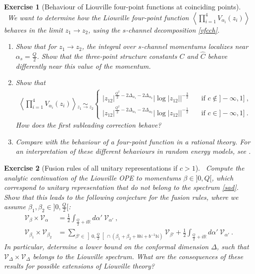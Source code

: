 \documentclass[12pt, a4paper, notitlepage, twoside]{report}
\numberwithin{equation}{section}
\theoremstyle{break}
\newtheorem{exo}{Exercise}[chapter]
\begin{document}
\begin{exo}[Behaviour of Liouville four-point functions at coinciding points]
~\label{exo4a} 
We want to determine how the Liouville four-point function $\left<\prod_{i=1}^4 V_{\alpha_i}(z_i)\right>$ behaves in the limit $z_1\to z_2$, using the $s$-channel decomposition \eqref{vfcch}.
\begin{enumerate}
 \item Show that for $z_1\to z_2$, the integral over $s$-channel momentums localizes near $\alpha_s=\frac{Q}{2}$. Show that the three-point structure constants $C$ and $\hat C$ behave differently near this value of the momentum.
 \item Show that 
 \begin{align}
  \left<\prod_{i=1}^4 V_{\alpha_i}(z_i)\right> \underset{z_1\to z_2}{\sim} \left\{
  \begin{array}{ll} 
  |z_{12}|^{\frac{Q^2}{2} -2\Delta_{\alpha_1}-2\Delta_{\alpha_2}} \left|\log|z_{12}|\right|^{-\frac32} &\quad \text{if \ } c\notin ]-\infty,1]\ ,
  \\
  |z_{12}|^{\frac{Q^2}{2} -2\Delta_{\alpha_1}-2\Delta_{\alpha_2}} \left|\log|z_{12}|\right|^{-\frac12} &\quad \text{if \ } c\in ]-\infty,1]\ .
  \end{array}\right.
 \end{align}
How does the first subleading correction behave?
\item Compare with the behaviour of a four-point function in a rational theory. 
For an interpretation of these different behaviours in random energy models, see \cite{clrs16}.
\end{enumerate}
\end{exo}


\begin{exo}[Fusion rules of all unitary representations if $c>1$]
 ~\label{exoaur}
Compute the analytic continuation of the Liouville OPE to momentums $\beta\in ]0,Q[$, which correspond to unitary representation that do not belong to the spectrum \eqref{sad}. 
Show that this leads to the following conjecture for the fusion rules, where we assume $\beta_1,\beta_2\in ]0,\frac{Q}{2}[$:
\begin{align}
 \mathcal{V}_\beta \times \mathcal{V}_\alpha  
&= \frac12 \int_{\frac{Q}{2}+i\mathbb{R}} d\alpha'\ \mathcal{V}_{\alpha'}\ ,
\\
 \mathcal{V}_{\beta_1} \times \mathcal{V}_{\beta_2} 
&= \sum_{\beta'\in \left]0,\frac{Q}{2}\right[\cap \left(\beta_1+\beta_2 + b\mathbb{N}+b^{-1}\mathbb{N}\right)} \mathcal{V}_{\beta'}  
+ \frac12 \int_{\frac{Q}{2}+i\mathbb{R}} d\alpha'\ \mathcal{V}_{\alpha'}\ .
\end{align}
In particular, determine a lower bound on the conformal dimension $\Delta$, such that $\mathcal{V}_\Delta \times \mathcal{V}_\Delta$ belongs to the Liouville spectrum.
What are the consequences of these results for possible extensions of Liouville theory?
\end{exo}
\end{document}
